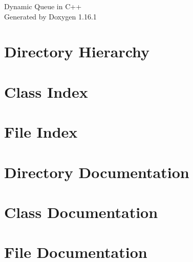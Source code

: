 \documentclass[twoside]{book}
\newcommand{\+}{\discretionary{\mbox{\scriptsize$\hookleftarrow$}}{}{}}
\newcommand{\clearemptydoublepage}{%
    \newpage{\pagestyle{empty}\cleardoublepage}%
  }
\begin{document}
  \raggedbottom
    \hypersetup{pageanchor=false,
                bookmarksnumbered=true,
                pdfencoding=unicode
               }
  \begin{titlepage}
  \vspace*{7cm}
  \begin{center}%
  {\Large Dynamic Queue in C++}\\
  \vspace*{1cm}
  {\large Generated by Doxygen 1.16.1}\\
  \end{center}
  \end{titlepage}
  \clearemptydoublepage
  \tableofcontents
  \clearemptydoublepage
  \hypersetup{pageanchor=true}


\chapter{Directory Hierarchy}

\chapter{Class Index}

\chapter{File Index}

\chapter{Directory Documentation}


\chapter{Class Documentation}


\chapter{File Documentation}











  \backmatter
  \newpage
  \clearemptydoublepage
  \printindex
\end{document}
